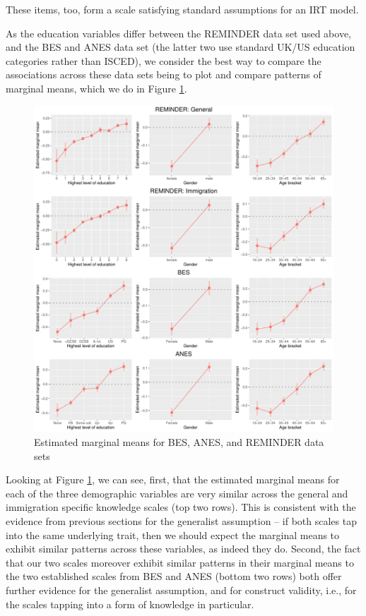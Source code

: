 \documentclass[12pt,halfline,a4paper,]{ouparticle}
\begin{document}
These items, too, form a scale satisfying standard assumptions for an
IRT model.

As the education variables differ between the REMINDER data set used
above, and the BES and ANES data set (the latter two use standard UK/US
education categories rather than ISCED), we consider the best way to
compare the associations across these data sets being to plot and
compare patterns of marginal means, which we do in Figure
\ref{fig:emmeans_plots1}.

\begin{figure}[!h]
\includegraphics[width=1\linewidth]{Revisiting-the-Measurement-and-Dimensionality-of-Political-Knowledge--Evidence-from-Seven-European-Countries_files/figure-latex/emmeans_plots1-1} \caption{Estimated marginal means for BES, ANES, and REMINDER data sets}\label{fig:emmeans_plots1}
\end{figure}

Looking at Figure \ref{fig:emmeans_plots1}, we can see, first, that the
estimated marginal means for each of the three demographic variables are
very similar across the general and immigration specific knowledge
scales (top two rows). This is consistent with the evidence from
previous sections for the generalist assumption -- if both scales tap
into the same underlying trait, then we should expect the marginal means
to exhibit similar patterns across these variables, as indeed they do.
Second, the fact that our two scales moreover exhibit similar patterns
in their marginal means to the two established scales from BES and ANES
(bottom two rows) both offer further evidence for the generalist
assumption, and for construct validity, i.e., for the scales tapping
into a form of knowledge in particular.
\end{document}
